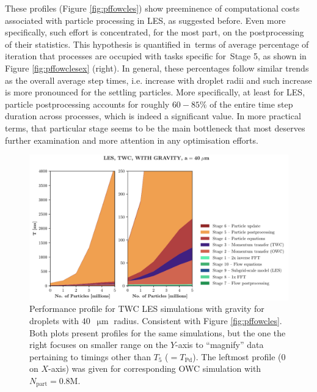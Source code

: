 \documentclass{pracamgren}
\begin{document}
These profiles (Figure \ref{fig:pffowcles}) show preeminence of computational costs associated with particle processing in LES, as suggested before.
Even more specifically, such effort is concentrated, for the most part, on the postprocessing of their statistics.
This hypothesis is quantified in~terms of average percentage of iteration that processes are occupied with tasks specific for~Stage 5, as shown in Figure \ref{fig:pffowclesex} (right).
In general, these percentages follow similar trends as the overall average step times, i.e. increase with droplet radii and such increase is more pronounced for the settling particles.
More specifically, at least for LES, particle postprocessing accounts for roughly $60-85 \%$ of the entire time step duration across processes,  which is indeed a significant value.
In more practical terms, that particular stage seems to be the main bottleneck that most deserves further examination and more attention in any optimisation efforts.  

\begin{figure}[h]
\centering
\includegraphics[width=13.5cm]{img/plots/3-3c-pfftwcles.pdf}
\caption{
Performance profile for TWC LES simulations with gravity for droplets with $40$~$\upmu\text{m}$ radius.
Consistent with Figure \ref{fig:pffowcles}.
Both plots present profiles for the same simulations, but the one the right focuses on smaller range on the $Y$-axis to ``magnify'' data pertaining to timings other than $T_5$ ($ = T_{\text{Pd}}$).
The leftmost profile ($0$ on $X$-axis) was given for corresponding OWC simulation with~$N_{\text{part}} = 0.8\text{M}$. 
}
\label{fig:pfftwcles}
\end{figure}
\end{document}
